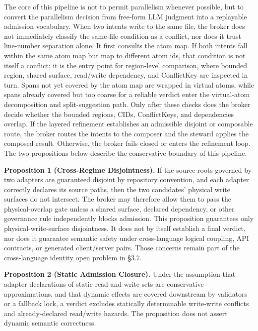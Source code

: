 \documentclass[9pt,letterpaper]{extarticle}
\begin{document}
The core of this pipeline is not to permit parallelism whenever possible, but to convert the parallelism decision from free-form LLM judgment into a replayable admission vocabulary. When two intents write to the same file, the broker does not immediately classify the same-file condition as a conflict, nor does it trust line-number separation alone. It first consults the atom map. If both intents fall within the same atom map but map to different atom ids, that condition is not itself a conflict; it is the entry point for region-level comparison, where bounded region, shared surface, read/write dependency, and ConflictKey are inspected in turn. Spans not yet covered by the atom map are wrapped in virtual atoms, while spans already covered but too coarse for a reliable verdict enter the virtual-atom decomposition and split-suggestion path. Only after these checks does the broker decide whether the bounded regions, CIDs, ConflictKeys, and dependencies overlap. If the layered refinement establishes an admissible disjoint or composable route, the broker routes the intents to the composer and the steward applies the composed result. Otherwise, the broker fails closed or enters the refinement loop. The two propositions below describe the conservative boundary of this pipeline.

\textbf{Proposition 1 (Cross-Regime Disjointness).} If the source roots governed by two adapters are guaranteed disjoint by repository convention, and each adapter correctly declares its source paths, then the two candidates' physical write surfaces do not intersect. The broker may therefore allow them to pass the physical-overlap gate unless a shared surface, declared dependency, or other governance rule independently blocks admission. This proposition guarantees only physical-write-surface disjointness. It does not by itself establish a final \texttt{} verdict, nor does it guarantee semantic safety under cross-language logical coupling, API contracts, or generated client/server pairs. Those concerns remain part of the cross-language identity open problem in §3.7.

\textbf{Proposition 2 (Static Admission Closure).} Under the assumption that adapter declarations of static read and write sets are conservative approximations, and that dynamic effects are covered downstream by validators or a fallback lock, a \texttt{} verdict excludes statically determinable write-write conflicts and already-declared read/write hazards. The proposition does not assert dynamic semantic correctness.
\end{document}
